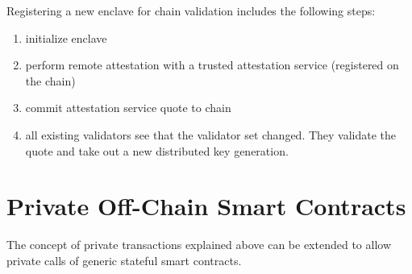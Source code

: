 \documentclass[conference]{IEEEtran}
\begin{document}
Registering a new enclave for chain validation includes the following steps:
\begin{enumerate}
	\item initialize \encointer enclave
	\item perform remote attestation with a trusted attestation service (registered on the \encointer chain)
	\item commit attestation service quote to \encointer chain
	\item all existing validators see that the validator set changed. They validate the quote and take out a new distributed key generation.
\end{enumerate}

%


\section{Private Off-Chain Smart Contracts}
The concept of private transactions explained above can be extended to allow private calls of generic stateful smart contracts. 
\end{document}
